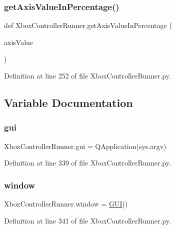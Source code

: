 \subsubsection{\texorpdfstring{get\+Axis\+Value\+In\+Percentage()}{getAxisValueInPercentage()}}
{\footnotesize\ttfamily def Xbox\+Controller\+Runner.\+get\+Axis\+Value\+In\+Percentage (\begin{DoxyParamCaption}\item[{}]{axis\+Value }\end{DoxyParamCaption})}



Definition at line 252 of file Xbox\+Controller\+Runner.\+py.



\subsection{Variable Documentation}
\mbox{\label{namespace_xbox_controller_runner_a1dfe9a9a9542fbbf1f5030bb2a642a8a}} 
\subsubsection{\texorpdfstring{gui}{gui}}
{\footnotesize\ttfamily Xbox\+Controller\+Runner.\+gui = Q\+Application(sys.\+argv)}



Definition at line 339 of file Xbox\+Controller\+Runner.\+py.

\mbox{\label{namespace_xbox_controller_runner_a4e420c15851287008c4dabe0a9621894}} 
\subsubsection{\texorpdfstring{window}{window}}
{\footnotesize\ttfamily Xbox\+Controller\+Runner.\+window = \mbox{\hyperlink{class_xbox_controller_runner_1_1_g_u_i}{G\+UI}}()}



Definition at line 341 of file Xbox\+Controller\+Runner.\+py.

